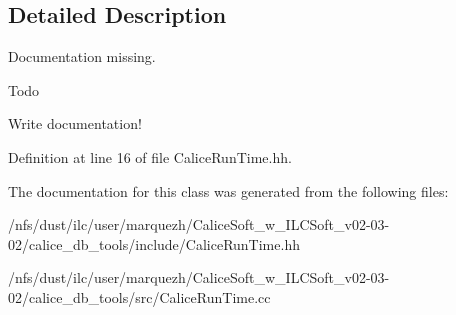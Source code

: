 \subsection{Detailed Description}
Documentation missing. \begin{DoxyRefDesc}{Todo}
\item[{\bf Todo}]Write documentation!\end{DoxyRefDesc}


Definition at line 16 of file Calice\-Run\-Time.\-hh.



The documentation for this class was generated from the following files\-:\begin{DoxyCompactItemize}
\item 
/nfs/dust/ilc/user/marquezh/\-Calice\-Soft\-\_\-w\-\_\-\-I\-L\-C\-Soft\-\_\-v02-\/03-\/02/calice\-\_\-db\-\_\-tools/include/Calice\-Run\-Time.\-hh\item 
/nfs/dust/ilc/user/marquezh/\-Calice\-Soft\-\_\-w\-\_\-\-I\-L\-C\-Soft\-\_\-v02-\/03-\/02/calice\-\_\-db\-\_\-tools/src/Calice\-Run\-Time.\-cc\end{DoxyCompactItemize}
